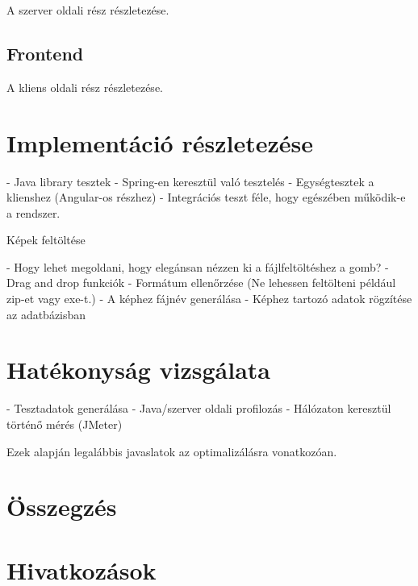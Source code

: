 \documentclass[11pt]{article}
\begin{document}

A szerver oldali rész részletezése.

\subsection{Frontend}

A kliens oldali rész részletezése.

\section{Implementáció részletezése}


- Java library tesztek
- Spring-en keresztül való tesztelés
- Egységtesztek a klienshez (Angular-os részhez)
- Integrációs teszt féle, hogy egészében működik-e a rendszer.



Képek feltöltése

- Hogy lehet megoldani, hogy elegánsan nézzen ki a fájlfeltöltéshez a gomb?
- Drag and drop funkciók
- Formátum ellenőrzése (Ne lehessen feltölteni például zip-et vagy exe-t.)
- A képhez fájnév generálása
- Képhez tartozó adatok rögzítése az adatbázisban

\section{Hatékonyság vizsgálata}


- Tesztadatok generálása
- Java/szerver oldali profilozás
- Hálózaton keresztül történő mérés (JMeter)

Ezek alapján legalábbis javaslatok az optimalizálásra vonatkozóan.

\section*{Összegzés}


\section*{Hivatkozások}
\end{document}
